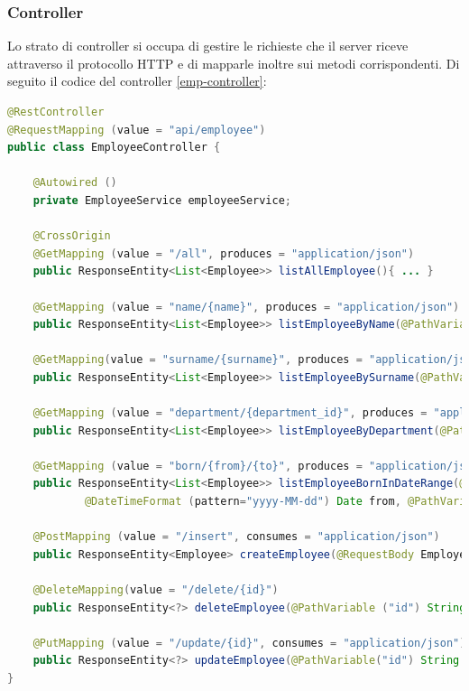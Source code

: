 \subsubsection*{Controller}
Lo strato di controller si occupa di gestire le richieste che il server riceve attraverso il protocollo HTTP e di mapparle inoltre sui metodi corrispondenti. Di seguito il codice del controller \ref{emp-controller}:
\begin{lstlisting}[title={EmployeeController.class}, label={emp-controller}, language=Java, morecomment={[s][\color{DarkOrchid}]{@}{\ }},  morecomment={[s][\color{OliveGreen}]{"}{"}},]
@RestController
@RequestMapping (value = "api/employee")
public class EmployeeController {

    @Autowired ()
    private EmployeeService employeeService;

    @CrossOrigin
    @GetMapping (value = "/all", produces = "application/json")
    public ResponseEntity<List<Employee>> listAllEmployee(){ ... }

    @GetMapping (value = "name/{name}", produces = "application/json")
    public ResponseEntity<List<Employee>> listEmployeeByName(@PathVariable("name") String name){ ... }

    @GetMapping(value = "surname/{surname}", produces = "application/json")
    public ResponseEntity<List<Employee>> listEmployeeBySurname(@PathVariable("surname") String surname){ ... }

    @GetMapping (value = "department/{department_id}", produces = "application/json")
    public ResponseEntity<List<Employee>> listEmployeeByDepartment(@PathVariable("department_id") Long id){ ... }

    @GetMapping (value = "born/{from}/{to}", produces = "application/json")
    public ResponseEntity<List<Employee>> listEmployeeBornInDateRange(@PathVariable("from")
            @DateTimeFormat (pattern="yyyy-MM-dd") Date from, @PathVariable ("to") @DateTimeFormat  (pattern="yyyy-MM-dd") Date to){ ... }

    @PostMapping (value = "/insert", consumes = "application/json")
    public ResponseEntity<Employee> createEmployee(@RequestBody Employee employee){ ... }

    @DeleteMapping(value = "/delete/{id}")
    public ResponseEntity<?> deleteEmployee(@PathVariable ("id") String id){ ... }

    @PutMapping (value = "/update/{id}", consumes = "application/json")
    public ResponseEntity<?> updateEmployee(@PathVariable("id") String id, @RequestBody Employee employee){ ... }
}
\end{lstlisting}
